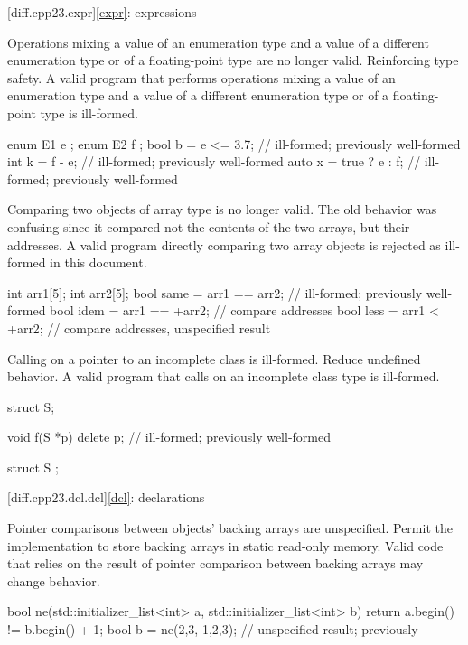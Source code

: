 [diff.cpp23.expr]{\ref*{expr}: expressions}

\change
Operations mixing a value of an enumeration type and a value of a different
enumeration type or of a floating-point type are no longer valid.
\rationale
Reinforcing type safety.
\effect
A valid \CppXXIII{} program that performs operations mixing a value of an
enumeration type and a value of a different enumeration type or of a
floating-point type is ill-formed.
\begin{example}
\begin{codeblock}
enum E1 { e };
enum E2 { f };
bool b = e <= 3.7;      // ill-formed; previously well-formed
int  k = f - e;         // ill-formed; previously well-formed
auto x = true ? e : f;  // ill-formed; previously well-formed
\end{codeblock}
\end{example}

\change
Comparing two objects of array type is no longer valid.
\rationale
The old behavior was confusing since it compared not the contents of the two
arrays, but their addresses.
\effect
A valid \CppXXIII{} program directly comparing two array objects is rejected as
ill-formed in this document.
\begin{example}
\begin{codeblock}
int arr1[5];
int arr2[5];
bool same = arr1 == arr2;       // ill-formed; previously well-formed
bool idem = arr1 == +arr2;      // compare addresses
bool less = arr1 < +arr2;       // compare addresses, unspecified result
\end{codeblock}
\end{example}

\change
Calling  on a pointer to an incomplete class is ill-formed.
\rationale
Reduce undefined behavior.
\effect
A valid \CppXXIII{} program that calls  on an incomplete
class type is ill-formed.
\begin{example}
\begin{codeblock}
struct S;

void f(S *p) {
  delete p;             // ill-formed; previously well-formed
}

struct S {};
\end{codeblock}
\end{example}

[diff.cpp23.dcl.dcl]{\ref*{dcl}: declarations}

\change
Pointer comparisons between  objects' backing arrays
are unspecified.
\rationale
Permit the implementation to store backing arrays in static read-only memory.
\effect
Valid \CppXXIII{} code
that relies on the result of pointer comparison between backing arrays
may change behavior.
\begin{example}
\begin{codeblock}
bool ne(std::initializer_list<int> a, std::initializer_list<int> b) {
  return a.begin() != b.begin() + 1;
}
bool b = ne({2,3}, {1,2,3});    // unspecified result; previously 
\end{codeblock}
\end{example}

